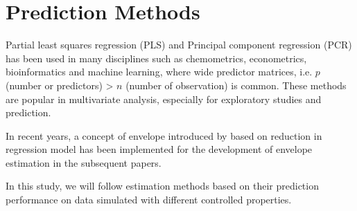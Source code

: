 \documentclass[12pt,3p,authoryear]{elsarticle}
\begin{document}
\hypertarget{prediction-methods}{%
\section{Prediction Methods}\label{prediction-methods}}

Partial least squares regression (PLS) and Principal component
regression (PCR) has been used in many disciplines such as chemometrics,
econometrics, bioinformatics and machine learning, where wide predictor
matrices, i.e. \(p\) (number or predictors) \textgreater{} \(n\) (number
of observation) is common. These methods are popular in multivariate
analysis, especially for exploratory studies and prediction.

In recent years, a concept of envelope introduced by \citet{Cook2007a}
based on reduction in regression model has been implemented for the
development of envelope estimation in the subsequent papers.

In this study, we will follow estimation methods based on their
prediction performance on data simulated with different controlled
properties.
\end{document}
